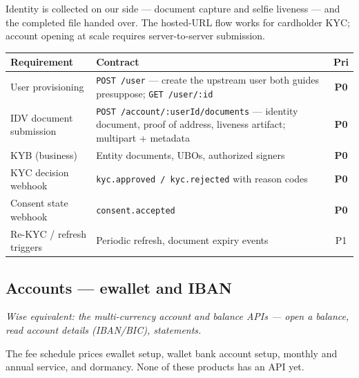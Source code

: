 \documentclass[11pt]{article}
\newcommand{\ep}[1]{\texttt{\small #1}}
\newcommand{\pri}[1]{\textbf{#1}}
\begin{document}
Identity is collected on our side --- document capture and selfie liveness --- and the completed file handed over. The hosted-URL flow works for cardholder KYC; account opening at scale requires server-to-server submission.

\begin{table}[H]
\centering
\small
\begin{tabular}{@{}p{5.4cm}p{7.2cm}c@{}}
\toprule
\textbf{Requirement} & \textbf{Contract} & \textbf{Pri} \\
\midrule
User provisioning & \ep{POST /user} --- create the upstream user both guides presuppose; \ep{GET /user/:id} & \pri{P0} \\
IDV document submission & \ep{POST /account/:userId/documents} --- identity document, proof of address, liveness artifact; multipart + metadata & \pri{P0} \\
KYB (business) & Entity documents, UBOs, authorized signers & \pri{P0} \\
KYC decision webhook & \ep{kyc.approved / kyc.rejected} with reason codes & \pri{P0} \\
Consent state webhook & \ep{consent.accepted} & \pri{P0} \\
Re-KYC / refresh triggers & Periodic refresh, document expiry events & P1 \\
\bottomrule
\end{tabular}
\end{table}

\subsection{Accounts --- ewallet and IBAN}\label{sec:acct}

\emph{Wise equivalent: the multi-currency account and balance APIs --- open a balance, read account details (IBAN/BIC), statements.}

The fee schedule prices ewallet setup, wallet bank account setup, monthly and annual service, and dormancy. None of these products has an API yet.
\end{document}
